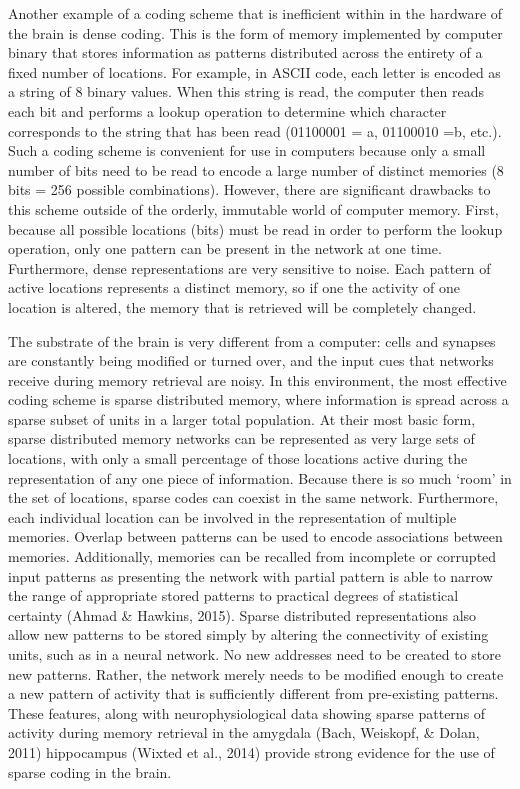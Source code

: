 \documentclass[12pt,a4paper,]{report}
\begin{document}
Another example of a coding scheme that is inefficient within in the
hardware of the brain is dense coding. This is the form of memory
implemented by computer binary that stores information as patterns
distributed across the entirety of a fixed number of locations. For
example, in ASCII code, each letter is encoded as a string of 8 binary
values. When this string is read, the computer then reads each bit and
performs a lookup operation to determine which character corresponds to
the string that has been read (01100001 = a, 01100010 =b, etc.). Such a
coding scheme is convenient for use in computers because only a small
number of bits need to be read to encode a large number of distinct
memories (8 bits = 256 possible combinations). However, there are
significant drawbacks to this scheme outside of the orderly, immutable
world of computer memory. First, because all possible locations (bits)
must be read in order to perform the lookup operation, only one pattern
can be present in the network at one time. Furthermore, dense
representations are very sensitive to noise. Each pattern of active
locations represents a distinct memory, so if one the activity of one
location is altered, the memory that is retrieved will be completely
changed.

The substrate of the brain is very different from a computer: cells and
synapses are constantly being modified or turned over, and the input
cues that networks receive during memory retrieval are noisy. In this
environment, the most effective coding scheme is sparse distributed
memory, where information is spread across a sparse subset of units in a
larger total population. At their most basic form, sparse distributed
memory networks can be represented as very large sets of locations, with
only a small percentage of those locations active during the
representation of any one piece of information. Because there is so much
`room' in the set of locations, sparse codes can coexist in the same
network. Furthermore, each individual location can be involved in the
representation of multiple memories. Overlap between patterns can be
used to encode associations between memories. Additionally, memories can
be recalled from incomplete or corrupted input patterns as presenting
the network with partial pattern is able to narrow the range of
appropriate stored patterns to practical degrees of statistical
certainty (Ahmad \& Hawkins, 2015). Sparse distributed representations
also allow new patterns to be stored simply by altering the connectivity
of existing units, such as in a neural network. No new addresses need to
be created to store new patterns. Rather, the network merely needs to be
modified enough to create a new pattern of activity that is sufficiently
different from pre-existing patterns. These features, along with
neurophysiological data showing sparse patterns of activity during
memory retrieval in the amygdala (Bach, Weiskopf, \& Dolan, 2011)
hippocampus (Wixted et al., 2014) provide strong evidence for the use of
sparse coding in the brain.
\end{document}
